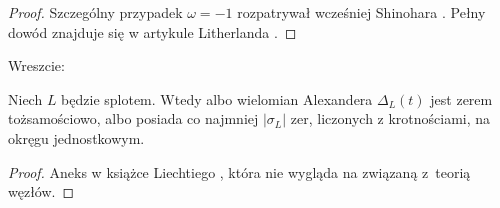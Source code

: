 \begin{proof}
    Szczególny przypadek $\omega = -1$ rozpatrywał wcześniej Shinohara \cite{shinohara1971}.
%
    Pełny dowód znajduje się w artykule Litherlanda \cite{litherland1979}.
%
\end{proof}

Wreszcie:

\begin{proposition}
    Niech $L$ będzie splotem.
    Wtedy albo wielomian Alexandera $\Delta_L(t)$ jest zerem tożsamościowo, albo posiada co najmniej $|\sigma_L|$ zer, liczonych z krotnościami, na okręgu jednostkowym.
\end{proposition}

\begin{proof}
    Aneks w książce Liechtiego \cite{liechti2016}, która nie wygląda na związaną z~teorią węzłów.
\end{proof}

%


